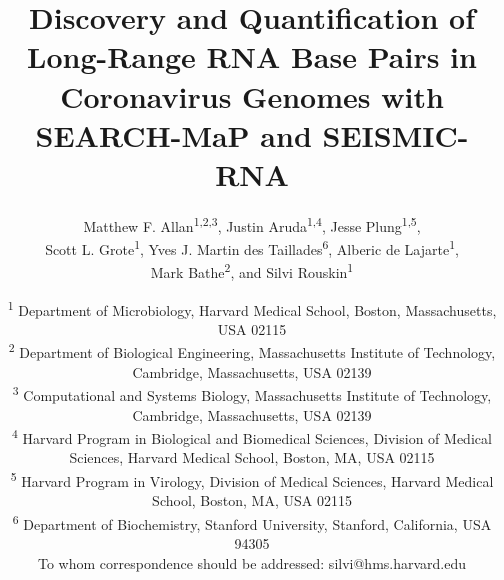 \documentclass[12pt,a4paper]{article}
\title{Discovery and Quantification of Long-Range RNA Base Pairs in Coronavirus Genomes with SEARCH-MaP and SEISMIC-RNA}
\author{Matthew F. Allan\textsuperscript{1,2,3}, Justin Aruda\textsuperscript{1,4}, Jesse Plung\textsuperscript{1,5}, \\ Scott L. Grote\textsuperscript{1}, Yves J. Martin des Taillades\textsuperscript{6}, Alberic de Lajarte\textsuperscript{1}, \\ Mark Bathe\textsuperscript{2}, and Silvi Rouskin\textsuperscript{1\textdagger}}
\date{
	\textsuperscript{1} Department of Microbiology, Harvard Medical School, Boston, Massachusetts, USA 02115 \\
	\textsuperscript{2} Department of Biological Engineering, Massachusetts Institute of Technology, Cambridge, Massachusetts, USA 02139 \\
	\textsuperscript{3} Computational and Systems Biology, Massachusetts Institute of Technology, Cambridge, Massachusetts, USA 02139 \\
	\textsuperscript{4} Harvard Program in Biological and Biomedical Sciences, Division of Medical Sciences, Harvard Medical School, Boston, MA, USA 02115 \\
	\textsuperscript{5} Harvard Program in Virology, Division of Medical Sciences, Harvard Medical School, Boston, MA, USA 02115 \\
	\textsuperscript{6} Department of Biochemistry, Stanford University, Stanford, California, USA 94305 \\
	\textsuperscript{\textdagger} To whom correspondence should be addressed: silvi@hms.harvard.edu \\
}
\begin{document}
\emergencystretch \textwidth

\begin{singlespace}
\maketitle
\end{singlespace}
\newpage

\newpage

\newpage

\newpage

\newpage

\newpage


\newpage
\begin{singlespace}
	
	
\end{singlespace}

\newpage

\end{document}
